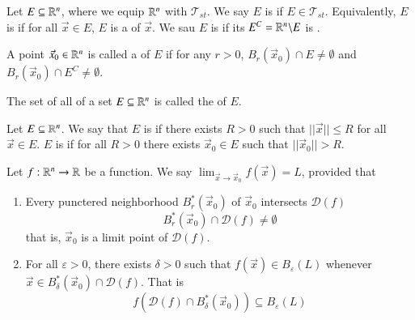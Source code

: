 \begin{appendices}
    \begin{defn}
        Let $E \subseteq \mathbb R^n$, where we equip $\mathbb R^n$ with $\mathscr{T}_{st}$. We say $E$ is  if $E \in \mathscr{T}_{st}$. Equivalently, $E$ is  if for all $\vec{x} \in E$, $E$ is a  of $\vec{x}$. We sau $E$ is  if its  $E^C = \mathbb R^n\backslash E$ is .
    \end{defn}

    \begin{defn}
        A point $\vec{x}_0 \in \mathbb R^n$ is called a  of $E$ if for any $r > 0$, $B_r(\vec{x}_0) \cap E \neq \emptyset$ and $B_r(\vec{x}_0) \cap E^C \neq \emptyset$.
    \end{defn}

    \begin{defn}
        The set of all  of a set $E \subseteq \mathbb R^n$ is called the  of $E$.
    \end{defn}

    \begin{defn}
        Let $E \subseteq \mathbb R^n$. We say that $E$ is  if there exists $R > 0$ such that $||\vec{x}|| \leq R$ for all $\vec{x} \in E$. $E$ is  if for all $R > 0$ there exists $\vec{x}_0 \in E$ such that $||\vec{x}_0|| > R$.
    \end{defn}


    \begin{defn}
        Let $f:\mathbb R^n\rightarrow \mathbb R$ be a function. We say $\lim_{\vec{x}\rightarrow \vec{x}_0}f(\vec{x}) = L$, provided that \begin{enumerate}
            \item Every punctered neighborhood $B_r^*(\vec{x}_0)$ of $\vec{x}_0$ intersects $\mathscr{D}(f)$ 
                \begin{equation}
                        B_r^*(\vec{x}_0) \cap \mathscr{D}(f) \neq \emptyset
                \end{equation}
                that is, $\vec{x}_0$ is a limit point of $\mathscr{D}(f)$.
            \item For all $\varepsilon > 0$, there exists $\delta > 0$ such that $f(\vec{x}) \in B_{\varepsilon}(L)$ whenever $\vec{x} \in B_{\delta}^*(\vec{x}_0) \cap \mathscr{D}(f)$. That is \begin{equation}
                    f(\mathscr{D}(f)\cap B_{\delta}^*(\vec{x}_0)) \subseteq B_{\varepsilon}(L)
            \end{equation}
        \end{enumerate}
    \end{defn}


\end{appendices}

